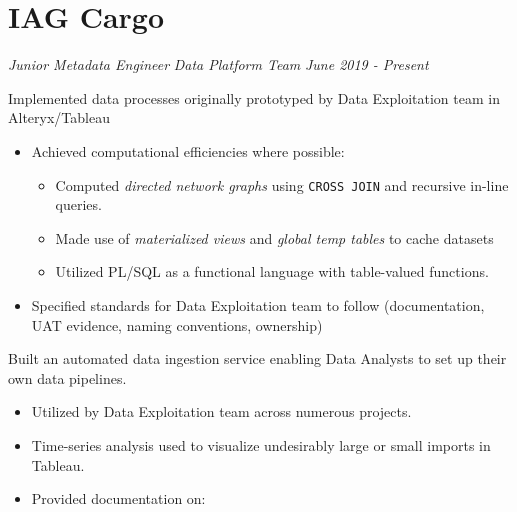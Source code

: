 \documentclass[../cv.tex]{subfiles}
\begin{document}
\section{IAG Cargo}
\textit{Junior Metadata Engineer}
\hfill
\textit{Data Platform Team}
\hfill
\textit{June 2019 - Present}
\begin{description}[style=multiline, leftmargin=3.5cm]
	\item[Prototype Implementation\\\textnormal{PL/SQL}] Implemented data processes originally prototyped by Data Exploitation team in Alteryx/Tableau
	      \begin{itemize}
		      \item Achieved computational efficiencies where possible:
		            \begin{itemize}
			            \item Computed \textit{directed network graphs} using \texttt{CROSS JOIN} and recursive in-line queries.
			            \item Made use of \textit{materialized views} and \textit{global temp tables} to cache datasets
			            \item Utilized PL/SQL as a functional language with table-valued functions.
		            \end{itemize}
		      \item Specified standards for Data Exploitation team to follow (documentation, UAT evidence, naming conventions, ownership)
	      \end{itemize}
	\item[Self-Service Data Ingestion\\\textnormal{Python, Powershell}]
	      Built an automated data ingestion service enabling Data Analysts to set up their own data pipelines.
		  \begin{itemize}
			\item Utilized by Data Exploitation team across numerous projects.
		      \item Time-series analysis used to visualize undesirably large or small imports in Tableau.
		      \item Provided documentation on:
	      \end{itemize}

\end{description}
\end{document}
